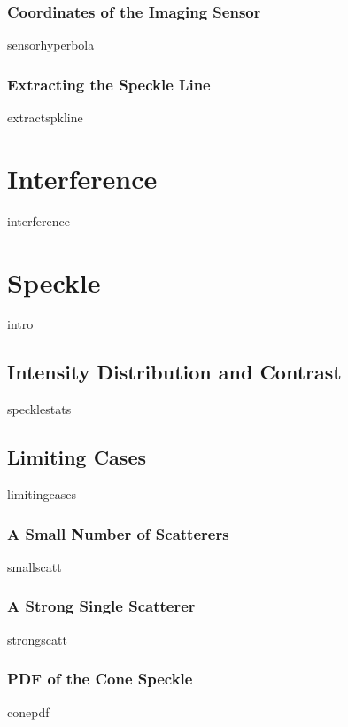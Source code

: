 \documentclass[12pt,a4paper,titlepage,onecolumn]{report}
\begin{document}
\subsection{Coordinates of the Imaging Sensor}
{sensorhyperbola}
\subsection{Extracting the Speckle Line}\label{sec:spkline}
{extractspkline}

\chapter{Interference}\label{ch:interference}
{interference}

\chapter{Speckle}\label{ch:speckle}
{intro}
\section{Intensity Distribution and Contrast}
{specklestats}
\section{Limiting Cases}
{limitingcases}
\subsection{A Small Number of Scatterers}
{smallscatt}
\subsection{A Strong Single Scatterer}
{strongscatt}
\subsection{PDF of the Cone Speckle}
{conepdf}
\end{document}
